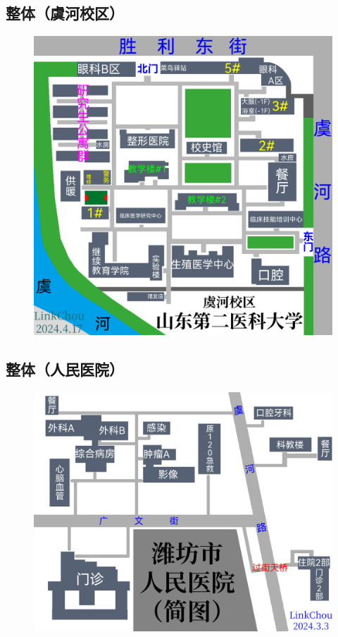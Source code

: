 \subsection[整体（虞河校区）]{整体（虞河校区）}
\noindent\begin{figure}[H]
    \centering
    \vspace{1em}
    \noindent\includegraphics*[width=\linewidth]{虞河校区.pdf}
    \label{map_y}
\end{figure}

\newpage
\subsection[整体（人民医院）]{整体（人民医院）}
\noindent\begin{figure}[H]
    \centering
    \vspace{1em}
    \noindent\includegraphics*[width=\linewidth]{人民医院.pdf}
    \label{map_h}
\end{figure}
